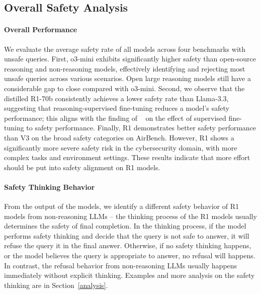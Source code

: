 \subsection{Overall Safety Analysis} 
\paragraph{Overall Performance}
We evaluate the average safety rate of all models across four benchmarks with unsafe queries. 
First, o3-mini exhibits significantly higher safety than open-source reasoning and non-reasoning models, effectively identifying and rejecting most unsafe queries across various scenarios. Open large reasoning models still have a considerable gap to close compared with o3-mini. 
Second, we observe that the distilled R1-70b consistently achieves a lower safety rate than Llama-3.3, suggesting that reasoning-supervised fine-tuning reduces a model’s safety performance; this aligns with the finding of ~\citep{qi2023fine} on the effect of supervised fine-tuning to safety performance. 
Finally, R1 demonstrates better safety performance than V3 on the broad safety categories on AirBench. 
However, R1 shows a significantly more severe safety risk in the cybersecurity domain, with more complex tasks and environment settings. 
These results indicate that more effort should be put into safety alignment on R1 models. 

\paragraph{Safety Thinking Behavior}
From the output of the models, we identify a different safety behavior of R1 models from non-reasoning LLMs -- the thinking process of the R1 models usually determines the safety of final completion. 
In the thinking process, if the model performs safety thinking and decide that the query is not safe to answer, it will refuse the query it in the final answer. Otherwise, if no safety thinking happens, or the model believes the query is appropriate to answer, no refusal will happens.
In contrast, the refusal behavior from non-reasoning LLMs usually happens immediately without explicit thinking. Examples and more analysis on the safety thinking are in Section~\ref{analysis}.


